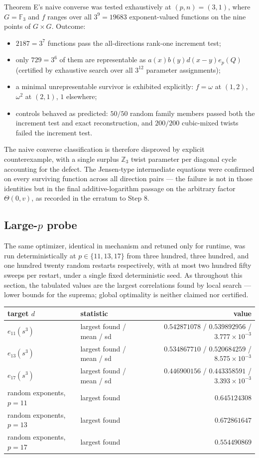 \documentclass[11pt]{article}
\begin{document}
Theorem E's naive converse was tested exhaustively at $(p,n)=(3,1)$, where
$G=\mathbb{F}_3$ and $f$ ranges over all $3^{9}=19683$ exponent-valued
functions on the nine points of $G\times G$. Outcome:
\begin{itemize}
\item $2187=3^{7}$ functions pass the all-directions rank-one increment
test;
\item only $729=3^{6}$ of them are representable as
$a(x)b(y)d(x-y)e_p(Q)$ (certified by exhaustive search over all
$3^{12}$ parameter assignments);
\item a minimal unrepresentable survivor is exhibited explicitly:
$f=\omega$ at $(1,2)$, $\omega^{2}$ at $(2,1)$, $1$ elsewhere;
\item controls behaved as predicted: $50/50$ random family members passed
both the increment test and exact reconstruction, and $200/200$ cubic-mixed
twists failed the increment test.
\end{itemize}
The naive converse classification is therefore disproved by explicit
counterexample, with a single surplus $\mathbb{Z}_3$ twist parameter per
diagonal cycle accounting for the defect. The Jensen-type intermediate
equations were confirmed on every surviving function across all direction
pairs — the failure is not in those identities but in the final
additive-logarithm passage on the arbitrary factor $\Theta(0,v)$, as
recorded in the erratum to Step 8.

\subsection{Large-$p$ probe}
The same optimizer, identical in mechanism and retuned only for runtime, was
run deterministically at $p\in\{11,13,17\}$ from three hundred, three
hundred, and one hundred twenty random restarts respectively, with at most
two hundred fifty sweeps per restart, under a single fixed deterministic
seed. As throughout this section, the tabulated values are the largest
correlations found by local search — lower bounds for the suprema; global
optimality is neither claimed nor certified.
\begin{center}
\begin{tabular}{llr}
\toprule
target $d$ & statistic & value \\
\midrule
$e_{11}(s^{3})$ & largest found / mean / sd &
$0.542871078$ / $0.539892956$ / $3.777\times10^{-3}$ \\
$e_{13}(s^{3})$ & largest found / mean / sd &
$0.534867710$ / $0.520684259$ / $8.575\times10^{-3}$ \\
$e_{17}(s^{3})$ & largest found / mean / sd &
$0.446900156$ / $0.443358591$ / $3.393\times10^{-3}$ \\
\midrule
random exponents, $p=11$ & largest found & $0.645124308$ \\
random exponents, $p=13$ & largest found & $0.672861647$ \\
random exponents, $p=17$ & largest found & $0.554490869$ \\
\bottomrule
\end{tabular}
\end{center}
\end{document}

